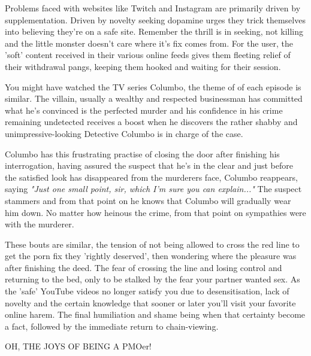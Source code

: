 \documentclass[easypeasy.tex]{subfiles}
\begin{document}
Problems faced with websites like Twitch and Instagram are primarily driven by supplementation. Driven by novelty seeking dopamine urges they trick themselves into believing they're on a safe site. Remember the thrill is in seeking, not killing and the little monster doesn't care where it's fix comes from. For the user, the 'soft' content received in their various online feeds gives them fleeting relief of their withdrawal pangs, keeping them hooked and waiting for their session.

You might have watched the TV series Columbo, the theme of of each episode is similar. The villain, usually a wealthy and respected businessman has committed what he's convinced is the perfected murder and his confidence in his crime remaining undetected receives a boost when he discovers the rather shabby and unimpressive-looking Detective Columbo is in charge of the case.

Columbo has this frustrating practise of closing the door after finishing his interrogation, having assured the suspect that he's in the clear and just before the satisfied look has disappeared from the murderers face, Columbo reappears, saying \textit{"Just one small point, sir, which I'm sure you can explain..."} The suspect stammers and from that point on he knows that Columbo will gradually wear him down. No matter how heinous the crime, from that point on sympathies were with the murderer.

These bouts are similar, the tension of not being allowed to cross the red line to get the porn fix they 'rightly deserved', then wondering where the pleasure was after finishing the deed. The fear of crossing the line and losing control and returning to the bed, only to be stalked by the fear your partner wanted sex. As the 'safe' YouTube videos no longer satisfy you due to desensitisation, lack of novelty and the certain knowledge that sooner or later you'll visit your favorite online harem. The final humiliation and shame being when that certainty become a fact, followed by the immediate return to chain-viewing.

{\huge OH, THE JOYS OF BEING A PMOer!}
\end{document}
